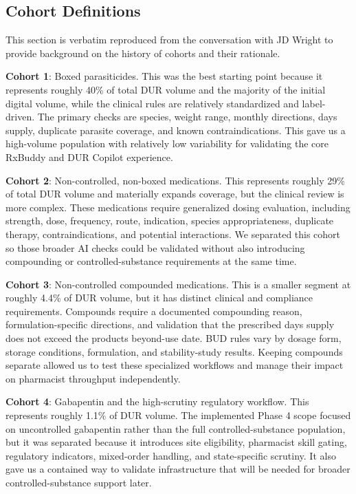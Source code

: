 \subsection{Cohort Definitions}
This section is verbatim reproduced from the conversation with JD Wright to provide
background on the history of cohorts and their rationale.

\textbf{Cohort 1}: Boxed parasiticides. This was the best starting point
because it represents roughly 40\% of total DUR volume and the
majority of the initial digital volume, while the clinical rules are
relatively standardized and label-driven. The primary checks are
species, weight range, monthly directions, days\textquotesingle{}
supply, duplicate parasite coverage, and known contraindications. This
gave us a high-volume population with relatively low variability for
validating the core RxBuddy and DUR Copilot experience.

\textbf{Cohort 2}: Non-controlled, non-boxed medications. This represents
roughly 29\% of total DUR volume and materially expands coverage, but
the clinical review is more complex. These medications require
generalized dosing evaluation, including strength, dose, frequency,
route, indication, species appropriateness, duplicate therapy,
contraindications, and potential interactions. We separated this
cohort so those broader AI checks could be validated without also
introducing compounding or controlled-substance requirements at the
same time.

\textbf{Cohort 3}: Non-controlled compounded medications. This is a smaller
segment at roughly 4.4\% of DUR volume, but it has distinct clinical
and compliance requirements. Compounds require a documented
compounding reason, formulation-specific directions, and validation
that the prescribed days\textquotesingle{} supply does not exceed the
product\textquotesingle s beyond-use date. BUD rules vary by dosage
form, storage conditions, formulation, and stability-study results.
Keeping compounds separate allowed us to test these specialized
workflows and manage their impact on pharmacist throughput
independently.

\textbf{Cohort 4}: Gabapentin and the high-scrutiny regulatory workflow. This
represents roughly 1.1\% of DUR volume. The implemented Phase 4 scope
focused on uncontrolled gabapentin rather than the full
controlled-substance population, but it was separated because it
introduces site eligibility, pharmacist skill gating, regulatory
indicators, mixed-order handling, and state-specific scrutiny. It also
gave us a contained way to validate infrastructure that will be needed
for broader controlled-substance support later.
